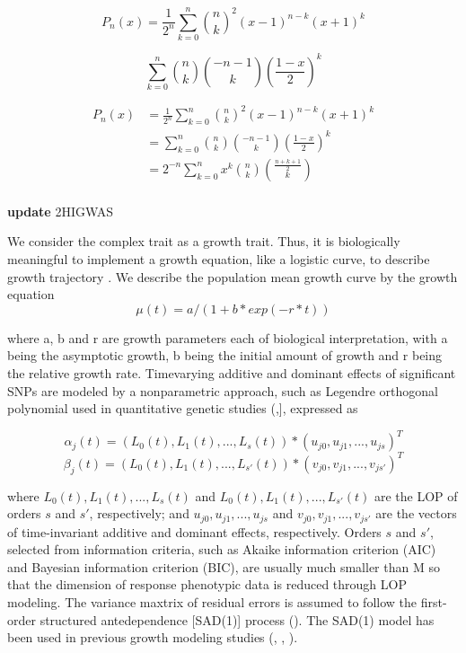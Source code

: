 \documentclass[]{book}
\theoremstyle{definition}
\theoremstyle{definition}
\theoremstyle{remark}
\begin{document}
\[P_n(x) = \frac{1}{2^n}\sum_{k=0}^{n}{{n}\choose{k}}^2(x-1)^{n-k}(x+1)^k\]

\[\sum_{k=0}^{n}{{n}\choose{k}}{{-n-1}\choose{k}}{\left(\frac{1-x}{2}\right)}^k\]

\begin{equation}
\begin{split}
P_n(x) & = \frac{1}{2^n}\sum_{k=0}^{n}{{n}\choose{k}}^2(x-1)^{n-k}(x+1)^k \\
& = \sum_{k=0}^{n}{{n}\choose{k}}{{-n-1}\choose{k}}{\left(\frac{1-x}{2}\right)}^k \\
& = 2^{-n}\sum_{k=0}^{n} x^k {{n}\choose{k}}{{\frac{n+k+1}{2}}\choose{k}} \\
\end{split}
\label{eq:leg-eq}
\end{equation}

\textbf{update} 2HIGWAS \cite{jiang20152higwas}

We consider the complex trait as a growth trait. Thus, it is
biologically meaningful to implement a growth equation, like a logistic
curve, to describe growth trajectory \cite{west2001general}. We describe
the population mean growth curve by the growth equation
\[ \mu(t) = a/(1 + b * exp(-r*t)) \]

where a, b and r are growth parameters each of biological
interpretation, with a being the asymptotic growth, b being the initial
amount of growth and r being the relative growth rate. Timevarying
additive and dominant effects of significant SNPs are modeled by a
nonparametric approach, such as Legendre orthogonal polynomial used in
quantitative genetic studies
(\cite{olori1999estimating},\cite{li2010functional}{]}, expressed as

\[ \alpha_j(t) = (L_0(t), L_1(t), ... , L_s(t))*(u_{j0}, u_{j1},...,u_{js})^T \]
\[ \beta_j(t) = (L_0(t), L_1(t), ... , L_{s'}(t))*(v_{j0}, v_{j1},...,v_{js'})^T \]

where \(L_0(t), L_1(t), ... , L_s(t)\) and
\(L_0(t), L_1(t), ... , L_{s'}(t)\) are the LOP of orders \(s\) and
\(s'\), respectively; and \(u_{j0}, u_{j1},...,u_{js}\) and
\(v_{j0}, v_{j1},...,v_{js'}\) are the vectors of time-invariant
additive and dominant effects, respectively. Orders \(s\) and \(s'\),
selected from information criteria, such as Akaike information criterion
(AIC) and Bayesian information criterion (BIC), are usually much smaller
than M so that the dimension of response phenotypic data is reduced
through LOP modeling. The variance maxtrix of residual errors is assumed
to follow the first-order structured antedependence {[}SAD(1){]} process
(\cite{li2010functional}). The SAD(1) model has been used in previous
growth modeling studies (\cite{li2010functional},
\cite{ahn2010functional}, \cite{das2011dynamic}).
\end{document}
